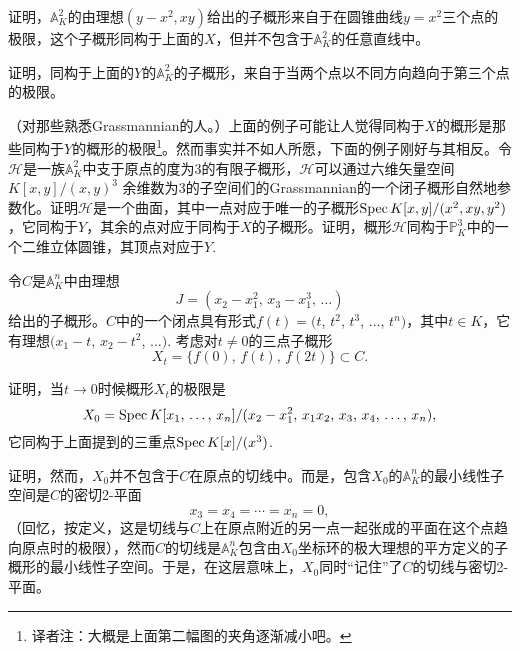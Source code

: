 \begin{exe}
	\begin{compactenum}[(i)]
		\item 证明，$\mathbb{A}_K^2$的由理想$(y-x^2,xy)$给出的子概形来自于在圆锥曲线$y=x^2$三个点的极限，这个子概形同构于上面的$X$，但并不包含于$\mathbb{A}_K^2$的任意直线中。


		\item 证明，同构于上面的$Y$的$\mathbb{A}_K^2$的子概形，来自于当两个点以不同方向趋向于第三个点的极限。
	\end{compactenum}
\end{exe}

\begin{exe} （对那些熟悉Grassmannian的人。）上面的例子可能让人觉得同构于$X$的概形是那些同构于$Y$的概形的极限\footnote{译者注：大概是上面第二幅图的夹角逐渐减小吧。}。然而事实并不如人所愿，下面的例子刚好与其相反。令$\mathscr{H}$是一族$\mathbb{A}_K^2$中支于原点的度为$3$的有限子概形，$\mathscr{H}$可以通过六维矢量空间$K[x,y]/(x,y)^3$ 余维数为$3$的子空间们的Grassmannian的一个闭子概形自然地参数化。证明$\mathscr{H}$是一个曲面，其中一点对应于唯一的子概形$\operatorname{Spec} K[x,y]/(x^2,xy,y^2)$，它同构于$Y$，其余的点对应于同构于$X$的子概形。证明，概形$\mathscr{H}$同构于$\mathbb{P}^3_K$中的一个二维立体圆锥，其顶点对应于$Y$.
\end{exe}

\begin{exe}
	令$C$是$\mathbb{A}_K^n$中由理想
	\[
	J=(\text{$x_2-x_1^2$, $x_3-x_1^3$, $\dots$})
	\]
	给出的子概形。$C$中的一个闭点具有形式$f(t)=(t$, $t^2$, $t^3$, $\dots$, $t^n)$，其中$t\in K$，它有理想$(x_1-t$, $x_2-t^2$, $\dots)$. 考虑对$t\neq 0$的三点子概形
	\[
	X_t=\{\text{$f(0)$, $f(t)$, $f(2t)$}\}\subset C.
	\]

	\begin{compactenum}[(a)]
		\item 证明，当$t\to 0$时候概形$X_t$的极限是
		\[
		X_0=\operatorname{Spec} K[\text{$x_1$, $\dots$, $x_n$}]/(\text{$x_2-x_1^2$, $x_1x_2$, $x_3$, $x_4$, $\dots$, $x_n$}),
		\]
		它同构于上面提到的三重点$\operatorname{Spec} K[x]/(x^3)$.
		\item 证明，然而，$X_0$并不包含于$C$在原点的切线中。而是，包含$X_0$的$\mathbb{A}_K^n$的最小线性子空间是$C$的密切2-平面
		\[
		x_3=x_4=\cdots=x_n=0,
		\]
		（回忆，按定义，这是切线与$C$上在原点附近的另一点一起张成的平面在这个点趋向原点时的极限），然而$C$的切线是$\mathbb{A}_K^n$包含由$X_0$坐标环的极大理想的平方定义的子概形的最小线性子空间。于是，在这层意味上，$X_0$同时“记住”了$C$的切线与密切2-平面。
	\end{compactenum}
\end{exe}

